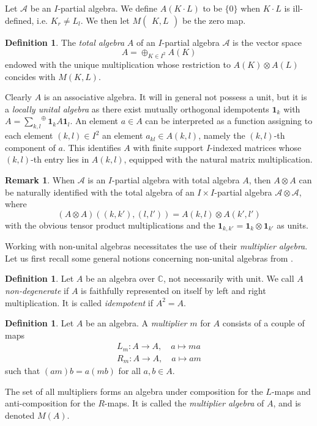 \documentclass[11pt]{article}
\newcommand{\C}{\mathbb{C}}
\newcommand{\osum}[1]{\underset{#1}{\sum}^{\oplus}}
\newcommand{\Grs}[3]{#1{\begin{pmatrix} #2,  #3\end{pmatrix}}}
\newcommand{\Unit}{\mathbf{1}}
\newcommand{\wmult}{\cdot}
\theoremstyle{definition}
\newtheorem{Def}[Theorem]{Definition}
\newtheorem{Rem}[Theorem]{Remark}
\numberwithin{equation}{section}
\begin{document}
Let $\mathscr{A}$ be an $I$-partial algebra. We define $A(K\wmult L)$ to be $\{0\}$ when $K\wmult L$ is ill-defined, i.e. $K_r\neq L_l$. We then let $\Grs{M}{K}{L}$ be the zero map.

\begin{Def} The \emph{total algebra} $A$ of an $I$-partial algebra $\mathscr{A}$ is the vector space \[A = \oplus_{K\in I^2} A(K)\] endowed with the unique multiplication whose restriction to $A(K)\otimes A(L)$ concides with $M(K,L)$. 
\end{Def} 

Clearly $A$ is an associative algebra. It will in general not possess a unit, but it is a \emph{locally unital algebra} as there exist mutually orthogonal idempotents $\mathbf{1}_k$ with $A = \osum{k,l} \mathbf{1}_kA\mathbf{1}_l$. An element $a\in A$ can be interpreted as a function assigning to each element $(k,l)\in I^2$ an element $a_{kl}\in A(k,l)$, namely the $(k,l)$-th component of $a$. This identifies $A$ with finite support $I$-indexed matrices whose $(k,l)$-th entry lies in $A(k,l)$, equipped with the natural matrix multiplication. 

\begin{Rem}\label{RemGrad} When $\mathscr{A}$ is an $I$-partial algebra with total algebra $A$, then $A\otimes A$ can be naturally identified with the total algebra of an $I\times I$-partial algebra $\mathscr{A}\otimes \mathscr{A}$, where \[(A\otimes A)((k,k'),(l,l')) = A(k,l)\otimes A(k',l')\] with the obvious tensor product multiplications and the $\Unit_{k,k'} = \Unit_k\otimes \Unit_{k'}$ as units. 
\end{Rem}

Working with non-unital algebras necessitates the use of their \emph{multiplier algebra}. Let us first recall some general notions concerning non-unital algebras from \cite{Dau1,VDae1}.

\begin{Def} Let $A$ be an algebra over $\C$, not necessarily with unit. We call $A$ \emph{non-degenerate} if $A$ is faithfully represented on itself by left and right multiplication. It is called \emph{idempotent} if $A^2 = A$. 
\end{Def}

\begin{Def} Let $A$ be an algebra. A \emph{multiplier} $m$ for $A$ consists of a couple of maps \begin{eqnarray*} L_m:A\rightarrow A,\quad a\mapsto ma\\ R_m:A\rightarrow A,\quad a\mapsto am\end{eqnarray*} such that $(am)b = a(mb)$ for all $a,b\in A$. 

The set of all multipliers forms an algebra under composition for the $L$-maps and anti-composition for the $R$-maps. It is called the \emph{multiplier algebra} of $A$, and is denoted $M(A)$.
\end{Def}
\end{document}
